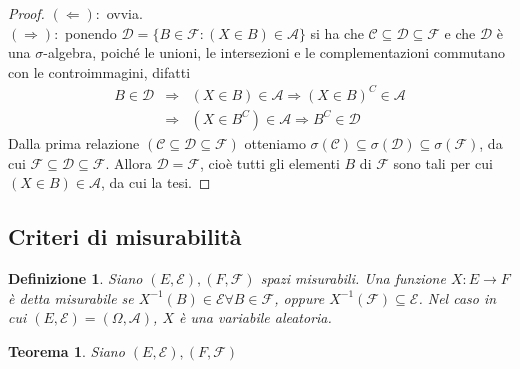 \documentclass[a4paper,12pt]{article}
\theoremstyle{break}
\newtheorem{theorem}{Teorema}[section]
\newtheorem{definition}{Definizione}[section]
\numberwithin{equation}{section}
\begin{document}
\begin{proof}
  \(( \Longleftarrow ):\) ovvia. \\
  \((\Longrightarrow):\) ponendo \(\mathcal{D} = \{B \in \mathcal{F} : (X \in B) \in \mathcal{A}\}\) si ha che \(\mathcal{C} \subseteq \mathcal{D} \subseteq \mathcal{F}\) e che \(\mathcal{D}\) è una \(\sigma\)-algebra, poiché le unioni, le intersezioni e le complementazioni commutano con le controimmagini, difatti 
  \[
    \begin{array}{ccc}
      B \in \mathcal{D} & \Longrightarrow & (X \in B) \in \mathcal{A} \Longrightarrow (X \in B)^C \in \mathcal{A} \\
      & \Longrightarrow & (X \in B^C) \in \mathcal{A} \Longrightarrow B^C \in \mathcal{D}
    \end{array} 
  \]
Dalla prima relazione \((\mathcal{C} \subseteq \mathcal{D} \subseteq \mathcal{F})\) otteniamo \(\sigma (\mathcal{C}) \subseteq \sigma(\mathcal{D}) \subseteq \sigma(\mathcal{F})\), da cui \(\mathcal{F} \subseteq \mathcal{D} \subseteq \mathcal{F}\). Allora \(\mathcal{D} = \mathcal{F}\), cioè tutti gli elementi \(B\) di \(\mathcal{F}\) sono tali per cui \((X \in B) \in \mathcal{A}\), da cui la tesi.
\end{proof}
\subsection{Criteri di misurabilità}
\begin{definition}
  Siano \((E, \mathcal{E}), (F, \mathcal{F})\) spazi misurabili. Una funzione \(X : E \longrightarrow F\) è detta misurabile se \(X^{-1} (B) \in \mathcal{E} \forall B \in \mathcal{F}\), oppure \(X^{-1} (\mathcal{F}) \subseteq \mathcal{E}\).
  Nel caso in cui \((E, \mathcal{E}) = (\Omega, \mathcal{A})\), \(X\) è una variabile aleatoria. 
\end{definition} 
\begin{theorem}
  Siano \((E, \mathcal{E}), (F, \mathcal{F})\)
\end{theorem}
\end{document}
